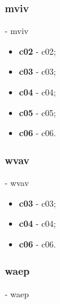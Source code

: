 	\hypertarget{mviv}{}
	\subsubsection{\textbf{\acs{mviv}}} - \Acl{mviv}

	\begin{itemize}
		\item \textbf{\acs{c02}} - \Acl{c02};
		\item \textbf{\acs{c03}} - \Acl{c03};
		\item \textbf{\acs{c04}} - \Acl{c04};
		\item \textbf{\acs{c05}} - \Acl{c05};
		\item \textbf{\acs{c06}} - \Acl{c06}.
	\end{itemize}


	\hypertarget{wvav}{}
	\subsubsection{\textbf{\acs{wvav}}} - \Acl{wvav}

	\begin{itemize}
		\item \textbf{\acs{c03}} - \Acl{c03};
		\item \textbf{\acs{c04}} - \Acl{c04};
		\item \textbf{\acs{c06}} - \Acl{c06}.
	\end{itemize}

	\hypertarget{waep}{}
	\subsubsection{\textbf{\acs{waep}}} - \Acl{waep}




